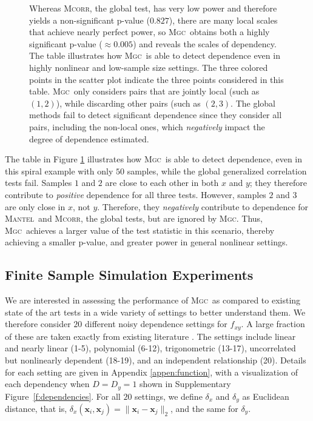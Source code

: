 \documentclass[11pt]{article}
\providecommand{\sct}[1]{{\normalfont\textsc{#1}}}
\providecommand{\mb}[1]{\boldsymbol{#1}}
\newcommand{\Mgc}{\sct{Mgc}}
\newcommand{\Mcorr}{\sct{Mcorr}}
\newcommand{\Mantel}{\sct{Mantel}}
\begin{document}
\begin{figure}[htbp]
{%
Whereas \Mcorr, the global test, has very low power and therefore yields a non-significant p-value ($0.827$),  there are many local scales that achieve nearly perfect power, so \Mgc~obtains both a highly significant p-value ($\approx 0.005$) and reveals the scales of dependency. The table illustrates how \Mgc~is able to detect dependence even in highly nonlinear and low-sample size settings. The three colored points in the scatter plot indicate the three points considered in this table. \Mgc~only considers pairs that are jointly local (such as $(1,2)$), while discarding other pairs (such as $(2,3)$. The global methods fail to detect significant dependence since they consider all pairs, including the non-local ones, which \emph{negatively} impact the degree of dependence estimated.
}
\label{f:schematic}
\end{figure}


The table in Figure \ref{f:schematic}  illustrates how \Mgc~is able to detect dependence, even in this spiral example with only $50$ samples, while the global generalized correlation tests fail.  Samples $1$ and $2$ are close to each other in both $x$ and $y$; they therefore contribute to \emph{positive} dependence for all three tests.  However, samples $2$ and $3$ are only close in $x$, not $y$.  Therefore, they  \emph{negatively} contribute to dependence for \Mantel~and \Mcorr, the global tests, but are ignored by \Mgc. Thus, \Mgc~achieves a larger value of the test statistic in this scenario, thereby achieving a smaller p-value, and greater power in general nonlinear settings.  





\subsection*{Finite Sample Simulation Experiments}


We are interested in assessing the performance of \Mgc~as compared to existing state of the art tests in a wide variety of settings to better understand them.  
We therefore consider $20$ different  noisy dependence settings for $f_{xy}$. A large fraction of these are taken exactly from existing literature \cite{SzekelyRizzoBakirov2007, SimonTibshirani2012, GorfineHellerHeller2012, HellerGorfine2013}.  
The settings include
linear and nearly linear  (1-5),
polynomial   (6-12),
trigonometric (13-17),
uncorrelated but nonlinearly dependent  (18-19),
and an independent relationship (20).
Details for each setting are given in Appendix \ref{appen:function}, with a visualization of each dependency when $D=D_y=1$ shown in Supplementary Figure~\ref{f:dependencies}. For all $20$ settings, we define  $\delta_x$ and $\delta_y$  as  Euclidean distance, that is, $\delta_x(\mb{x}_i,\mb{x}_j) = \|\mb{x}_i - \mb{x}_j\|_{2}$, and the same for $\delta_y$.
\end{document}

